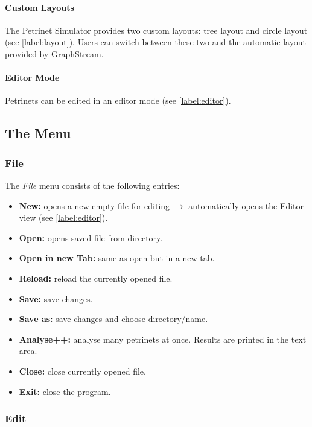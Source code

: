 \documentclass[10pt, a4paper]{article}
\begin{document}
\paragraph{Custom Layouts} The Petrinet Simulator provides two custom layouts: tree layout and circle layout (see \ref{label:layout}). Users can switch between these two and the automatic layout provided by GraphStream.

\paragraph{Editor Mode} Petrinets can be edited in an editor mode (see \ref{label:editor}).


\subsection{The Menu}

\subsubsection{File}
\label{label:file}
The \textit{File} menu consists of the following entries:

\begin{itemize}

\item \textbf{New:} opens a new empty file for editing $\rightarrow$ automatically opens the Editor view (see \ref{label:editor}). 
\item \textbf{Open:} opens saved file from directory.
\item \textbf{Open in new Tab:} same as open but in a new tab.
\item \textbf{Reload:} reload the currently opened file.
\item \textbf{Save:} save changes.
\item \textbf{Save as:} save changes and choose directory/name.
\item \textbf{Analyse++:} analyse many petrinets at once. Results are printed in the text area.
\item \textbf{Close:} close currently opened file.
\item \textbf{Exit:} close the program.

\end{itemize}


\subsubsection{Edit}
\end{document}
